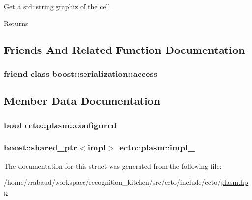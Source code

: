Get a std\-::string graphiz of the cell. 

\begin{DoxyReturn}{Returns}

\end{DoxyReturn}


\subsection{Friends And Related Function Documentation}
\hypertarget{structecto_1_1plasm_ac98d07dd8f7b70e16ccb9a01abf56b9c}{
\subsubsection[{boost\-::serialization\-::access}]{\setlength{\rightskip}{0pt plus 5cm}friend class boost\-::serialization\-::access\hspace{0.3cm}{\ttfamily [friend]}}}\label{structecto_1_1plasm_ac98d07dd8f7b70e16ccb9a01abf56b9c}


\subsection{Member Data Documentation}
\hypertarget{structecto_1_1plasm_a8d074da8290587fab0ed04d5cfe3f6b1}{
\subsubsection[{configured}]{\setlength{\rightskip}{0pt plus 5cm}bool ecto\-::plasm\-::configured\hspace{0.3cm}{\ttfamily [private]}}}\label{structecto_1_1plasm_a8d074da8290587fab0ed04d5cfe3f6b1}
\hypertarget{structecto_1_1plasm_a4cfd41e9dc82039a75970755565b2513}{
\subsubsection[{impl\-\_\-}]{\setlength{\rightskip}{0pt plus 5cm}boost\-::shared\-\_\-ptr$<$impl$>$ ecto\-::plasm\-::impl\-\_\-\hspace{0.3cm}{\ttfamily [private]}}}\label{structecto_1_1plasm_a4cfd41e9dc82039a75970755565b2513}


The documentation for this struct was generated from the following file\-:\begin{DoxyCompactItemize}
\item 
/home/vrabaud/workspace/recognition\-\_\-kitchen/src/ecto/include/ecto/\hyperlink{plasm_8hpp}{plasm.\-hpp}\end{DoxyCompactItemize}
